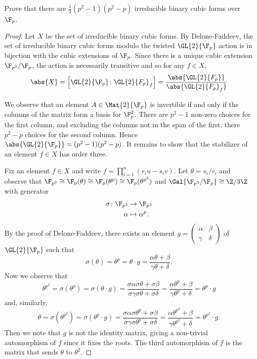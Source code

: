 \documentclass[10pt]{amsart}
\begin{document}
\setcounter{thm}{5}
\begin{thm}
  Prove that there are $\frac{1}{3}(p^2 - 1)(p^2 - p)$ irreducible binary cubic forms over $\F_p$.

  \begin{proof}
    Let $X$ be the set of irreducible binary cubic forms.
    By Delone-Faddeev, the set of irreducible binary cubic forms modulo the twisted $\GL{2}{\F_p}$ action is in bijection with the cubic extensions of $\F_p$.
    Since there is a unique cubic extension $\F_{p^3}/\F_p$, the action is necessarily transitive and so for any $f \in X$,
    $$\abs{X} = \left[\GL{2}{\F_p} \colon \GL{2}{F_p}_f \right] = \frac{\abs{\GL{2}{F_p}}}{\abs{\GL{2}{F_p}_f}}$$
    
    We observe that an element $A \in \Mat{2}{\F_p}$ is invertible if and only if the columns of the matrix form a basis for $\F_p^2$.
    There are $p^2 - 1$ non-zero choices for the first column, and excluding the columns not in the span of the first, there $p^2 - p$ choices for the second column.
    Hence $\abs{\GL{2}{\F_p}} = (p^2 - 1)(p^2 - p)$.
    It remains to show that the stabilizer of an element $f \in X$ has order three.
    
    Fix an element $f \in X$ and write $f = \prod_{i=1}^n(r_iu - s_iv)$.
    Let $\theta = s_i/r_i$ and observe that $\F_{p^3} \cong \F_p(\theta) \cong \F_p(\theta^p) \cong \F_p(\theta^{p^2})$ and $\Gal{\F_{p^3}/\F_p} \cong \Z/3\Z$ with generator
    \begin{align*}
      \sigma \colon \F_{p^3} & \rightarrow \F_{p^3}\\
      \alpha &\mapsto \alpha^p.
    \end{align*}
    By the proof of Delone-Faddeev, there exists an element $g = \left(\begin{array}{cc}\alpha & \beta\\ \gamma & \delta\end{array}\right)$ of $\GL{2}{\F_p}$ such that
      $$\sigma(\theta) = \theta^p = \theta \cdot g = \frac{\alpha \theta + \beta}{\gamma \theta + \delta}.$$
      Now we observe that 
      $$\theta^{p^2} = \sigma(\theta^p) = \sigma(\theta \cdot g) = \frac{\sigma\alpha \sigma\theta + \sigma\beta}{\sigma\gamma\sigma\theta + \sigma\delta} = \frac{\alpha\theta^p + \beta}{\gamma\theta^p + \delta} = \theta^p \cdot g$$
      and, similarly,
      $$\theta = \sigma(\theta^{p^2}) = \sigma(\theta^p \cdot g) = \frac{\sigma\alpha \sigma\theta^p + \sigma\beta}{\sigma\gamma\sigma\theta^p + \sigma\delta} = \frac{\alpha\theta^{p^2} + \beta}{\gamma\theta^{p^2} + \delta} = \theta^{p^2} \cdot g.$$
      Then we note that $g$ is not the identity matrix, giving a non-trivial automorphism of $f$ since it fixes the roots.
      The third automorphism of $f$ is the matrix that sends $\theta$ to $\theta^2$.
  \end{proof}
\end{thm}
\end{document}
